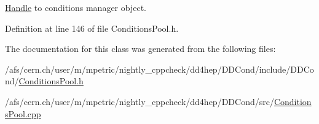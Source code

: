 \hyperlink{class_d_d4hep_1_1_handle}{Handle} to conditions manager object. 



Definition at line 146 of file Conditions\+Pool.\+h.



The documentation for this class was generated from the following files\+:\begin{DoxyCompactItemize}
\item 
/afs/cern.\+ch/user/m/mpetric/nightly\+\_\+cppcheck/dd4hep/\+D\+D\+Cond/include/\+D\+D\+Cond/\hyperlink{_conditions_pool_8h}{Conditions\+Pool.\+h}\item 
/afs/cern.\+ch/user/m/mpetric/nightly\+\_\+cppcheck/dd4hep/\+D\+D\+Cond/src/\hyperlink{_conditions_pool_8cpp}{Conditions\+Pool.\+cpp}\end{DoxyCompactItemize}
